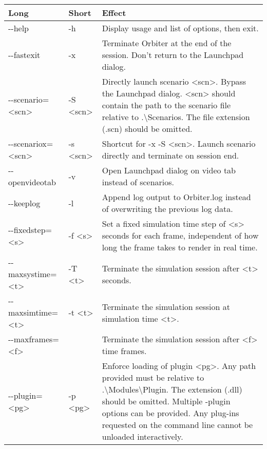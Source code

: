 \documentclass[Orbiter User Manual.tex]{subfiles}
\begin{document}
	\begin{longtable}{ |p{}|p{}|p{}| }
	\hline\rule{0pt}{2ex}
	\textbf{Long} & \textbf{Short} & \textbf{Effect}\\
	\hline\rule{0pt}{2ex}
	-{}-help & -h & Display usage and list of options, then exit.\\
	\hline\rule{0pt}{2ex}
	-{}-fastexit & -x & Terminate Orbiter at the end of the session. Don't return to the Launchpad dialog.\\
	\hline\rule{0pt}{2ex}
	-{}-scenario=<scn> & -S <scn> & Directly launch scenario <scn>. Bypass the Launchpad dialog. <scn> should contain the path to the scenario file relative to .\textbackslash Scenarios. The file extension (.scn) should be omitted.\\
	\hline\rule{0pt}{2ex}
	-{}-scenariox=<scn> & -s <scn> & Shortcut for -x -S <scn>. Launch scenario directly and terminate on session end.\\
	\hline\rule{0pt}{2ex}
	-{}-openvideotab & -v & Open Launchpad dialog on video tab instead of scenarios.\\
	\hline\rule{0pt}{2ex}
	-{}-keeplog & -l & Append log output to Orbiter.log instead of overwriting the previous log data.\\
	\hline\rule{0pt}{2ex}
	-{}-fixedstep=<s> & -f <s> & Set a fixed simulation time step of <s> seconds for each frame, independent of how long the frame takes to render in real time.\\
	\hline\rule{0pt}{2ex}
	-{}-maxsystime=<t> & -T <t> & Terminate the simulation session after <t> seconds.\\
	\hline\rule{0pt}{2ex}
	-{}-maxsimtime=<t> & -t <t> & Terminate the simulation session at simulation time <t>.\\
	\hline\rule{0pt}{2ex}
	-{}-maxframes=<f> & & Terminate the simulation session after <f> time frames.\\
	\hline\rule{0pt}{2ex}
	-{}-plugin=<pg> & -p <pg> & Enforce loading of plugin <pg>. Any path provided must be relative to .\textbackslash Modules\textbackslash Plugin. The extension (.dll) should be omitted. Multiple -plugin options can be provided. Any plug-ins requested on the command line cannot be unloaded interactively.\\
	\hline
	\end{longtable}
\end{document}
